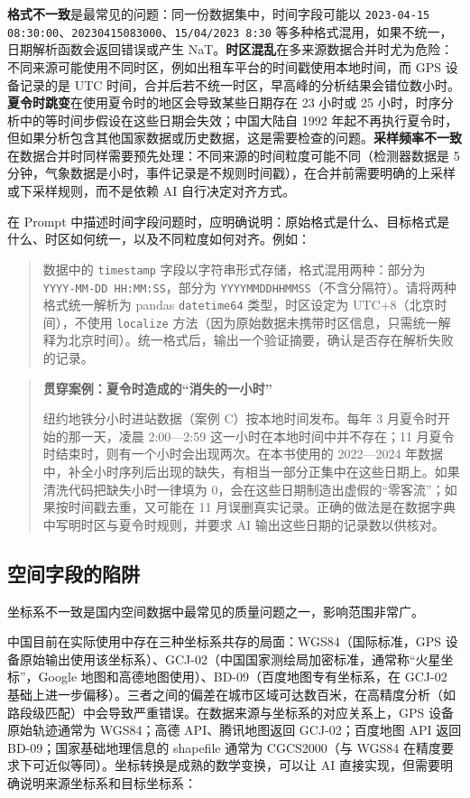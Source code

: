 \textbf{格式不一致}是最常见的问题：同一份数据集中，时间字段可能以 \texttt{2023-04-15 08:30:00}、\texttt{20230415083000}、\texttt{15/04/2023 8:30} 等多种格式混用，如果不统一，日期解析函数会返回错误或产生 NaT。\textbf{时区混乱}在多来源数据合并时尤为危险：不同来源可能使用不同时区，例如出租车平台的时间戳使用本地时间，而 GPS 设备记录的是 UTC 时间，合并后若不统一时区，早高峰的分析结果会错位数小时。\textbf{夏令时跳变}在使用夏令时的地区会导致某些日期存在 23 小时或 25 小时，时序分析中的等时间步假设在这些日期会失效；中国大陆自 1992 年起不再执行夏令时，但如果分析包含其他国家数据或历史数据，这是需要检查的问题。\textbf{采样频率不一致}在数据合并时同样需要预先处理：不同来源的时间粒度可能不同（检测器数据是 5 分钟，气象数据是小时，事件记录是不规则时间戳），在合并前需要明确的上采样或下采样规则，而不是依赖 AI 自行决定对齐方式。

在 Prompt 中描述时间字段问题时，应明确说明：原始格式是什么、目标格式是什么、时区如何统一，以及不同粒度如何对齐。例如：

\begin{quote}
数据中的 \texttt{timestamp} 字段以字符串形式存储，格式混用两种：部分为 \texttt{YYYY-MM-DD HH:MM:SS}，部分为 \texttt{YYYYMMDDHHMMSS}（不含分隔符）。请将两种格式统一解析为 pandas \texttt{datetime64} 类型，时区设定为 UTC+8（北京时间），不使用 \texttt{localize} 方法（因为原始数据未携带时区信息，只需统一解释为北京时间）。统一格式后，输出一个验证摘要，确认是否存在解析失败的记录。
\end{quote}

\begin{quote}
\textbf{贯穿案例：夏令时造成的“消失的一小时”}

纽约地铁分小时进站数据（案例 C）按本地时间发布。每年 3 月夏令时开始的那一天，凌晨 2:00—2:59 这一小时在本地时间中并不存在；11 月夏令时结束时，则有一个小时会出现两次。在本书使用的 2022—2024 年数据中，补全小时序列后出现的缺失，有相当一部分正集中在这些日期上。如果清洗代码把缺失小时一律填为 0，会在这些日期制造出虚假的“零客流”；如果按时间戳去重，又可能在 11 月误删真实记录。正确的做法是在数据字典中写明时区与夏令时规则，并要求 AI 输出这些日期的记录数以供核对。
\end{quote}

\subsection{空间字段的陷阱}

坐标系不一致是国内空间数据中最常见的质量问题之一，影响范围非常广。

中国目前在实际使用中存在三种坐标系共存的局面：WGS84（国际标准，GPS 设备原始输出使用该坐标系）、GCJ-02（中国国家测绘局加密标准，通常称“火星坐标”，Google 地图和高德地图使用）、BD-09（百度地图专有坐标系，在 GCJ-02 基础上进一步偏移）。三者之间的偏差在城市区域可达数百米，在高精度分析（如路段级匹配）中会导致严重错误。在数据来源与坐标系的对应关系上，GPS 设备原始轨迹通常为 WGS84；高德 API、腾讯地图返回 GCJ-02；百度地图 API 返回 BD-09；国家基础地理信息的 shapefile 通常为 CGCS2000（与 WGS84 在精度要求下可近似等同）。坐标转换是成熟的数学变换，可以让 AI 直接实现，但需要明确说明来源坐标系和目标坐标系：

